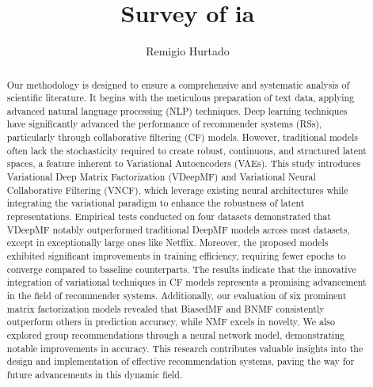 \documentclass[runningheads]{llncs}
\begin{document}
%
\title{Survey of ia}
%
%
\author{Remigio Hurtado}
%
%
%
\maketitle    
%
\begin{abstract}
Our methodology is designed to ensure a comprehensive and systematic analysis of scientific literature. It begins with the meticulous preparation of text data, applying advanced natural language processing (NLP) techniques. Deep learning techniques have significantly advanced the performance of recommender systems (RSs), particularly through collaborative filtering (CF) models. However, traditional models often lack the stochasticity required to create robust, continuous, and structured latent spaces, a feature inherent to Variational Autoencoders (VAEs). This study introduces Variational Deep Matrix Factorization (VDeepMF) and Variational Neural Collaborative Filtering (VNCF), which leverage existing neural architectures while integrating the variational paradigm to enhance the robustness of latent representations. Empirical tests conducted on four datasets demonstrated that VDeepMF notably outperformed traditional DeepMF models across most datasets, except in exceptionally large ones like Netflix. Moreover, the proposed models exhibited significant improvements in training efficiency, requiring fewer epochs to converge compared to baseline counterparts. The results indicate that the innovative integration of variational techniques in CF models represents a promising advancement in the field of recommender systems. Additionally, our evaluation of six prominent matrix factorization models revealed that BiasedMF and BNMF consistently outperform others in prediction accuracy, while NMF excels in novelty. We also explored group recommendations through a neural network model, demonstrating notable improvements in accuracy. This research contributes valuable insights into the design and implementation of effective recommendation systems, paving the way for future advancements in this dynamic field.
\end{abstract}
\end{document}
